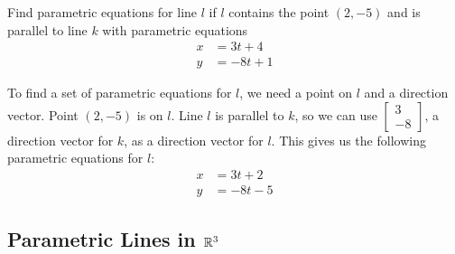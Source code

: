 \documentclass{ximera}
\begin{document}
\begin{example}\label{ex:parameqlinepoint}
Find parametric equations for line $l$ if $l$ contains the point $(2, -5)$ and is parallel to line $k$ with parametric equations
\begin{align*}
x&=3t+4\\
y&=-8t+1
\end{align*}
\begin{explanation}
To find a set of parametric equations for $l$, we need a point on $l$ and a direction vector.  Point $(2, -5)$ is on $l$.  Line $l$ is parallel to $k$, so we can use $\begin{bmatrix}3\\-8\end{bmatrix}$, a direction vector for $k$, as a direction vector for $l$.   This gives us the following parametric equations for $l$:
\begin{align*}
x&=3t+2\\
y&=-8t-5
\end{align*}
\end{explanation}
\end{example}

\subsection*{Parametric Lines in $\mathbb{R}^3$}
\end{document}
